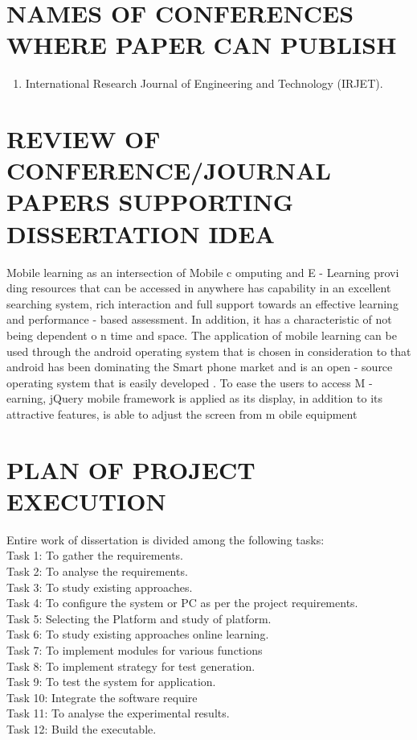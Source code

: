 \documentclass[oneside,a4paper,12pt]{report}
\begin{document}
{\section{NAMES OF CONFERENCES WHERE PAPER CAN PUBLISH}
\begin{enumerate}
\item International Research Journal of Engineering and Technology (IRJET).\\
\end{enumerate}

\section{REVIEW OF CONFERENCE/JOURNAL PAPERS SUPPORTING DISSERTATION IDEA}
\hspace*{0.3in}Mobile   learning   as   an   intersection   of   Mobile 
c
omputing and E
-
Learning provi
ding resources that can 
be accessed in anywhere has capability in an excellent 
searching  system,  rich  interaction  and  full  support 
towards an effective learning and performance
-
based 
assessment.  In  addition,  it  has  a  characteristic  of  not 
being dependent o
n time and space. The application of 
mobile  learning  can  be  used  through  the  android 
operating system that is chosen in consideration to that 
android has been dominating the Smart phone market 
and is an open
-
source operating system that is easily 
developed
.  To  ease  the  users  to  access  M
-
earning, 
jQuery  mobile  framework  is  applied  as  its  display,  in 
addition to its attractive features, is able to adjust the 
screen from m
obile equipment\\


\section{PLAN OF PROJECT EXECUTION}
\noindent
Entire work of dissertation is divided among the following tasks:\\
Task 1: To gather the requirements.\\
Task 2: To analyse the requirements.\\
Task 3: To study existing approaches.\\
Task 4: To configure the system or PC as per the project requirements.\\
Task 5: Selecting the Platform and study of platform.\\
Task 6: To study existing approaches online learning.\\
Task 7: To implement modules for various functions\\
Task 8: To implement strategy for test generation.\\
Task 9: To test the system for application.\\
Task 10: Integrate the software require\\
Task 11: To analyse the experimental results.\\
Task 12: Build the executable.\\

}
\end{document}
